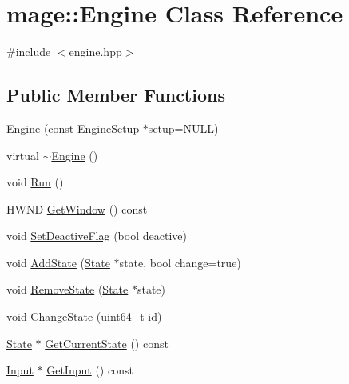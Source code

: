 \hypertarget{classmage_1_1_engine}{}\section{mage\+:\+:Engine Class Reference}
\label{classmage_1_1_engine}


{\ttfamily \#include $<$engine.\+hpp$>$}

\subsection*{Public Member Functions}
\begin{DoxyCompactItemize}
\item 
\hyperlink{classmage_1_1_engine_a5b49f3adf1dd889bb38f5325fd6db317}{Engine} (const \hyperlink{structmage_1_1_engine_setup}{Engine\+Setup} $\ast$setup=N\+U\+LL)
\item 
virtual \hyperlink{classmage_1_1_engine_a34628556f8397d70ed018d71e343c2f5}{$\sim$\+Engine} ()
\item 
void \hyperlink{classmage_1_1_engine_afdc05e214d3f47a6ea3a40dfffd86f80}{Run} ()
\item 
H\+W\+ND \hyperlink{classmage_1_1_engine_a1c5f9d8c68045b36f404251359aa41e4}{Get\+Window} () const
\item 
void \hyperlink{classmage_1_1_engine_a942bfa9892fa79bb1068d7c7ec4e6732}{Set\+Deactive\+Flag} (bool deactive)
\item 
void \hyperlink{classmage_1_1_engine_accbe7aea6388e097f7ce11a6c855f02a}{Add\+State} (\hyperlink{classmage_1_1_state}{State} $\ast$state, bool change=true)
\item 
void \hyperlink{classmage_1_1_engine_a72442e7262e498d0c82644f1ea413a95}{Remove\+State} (\hyperlink{classmage_1_1_state}{State} $\ast$state)
\item 
void \hyperlink{classmage_1_1_engine_a4f13698020e1e8ee155661c83a1d160d}{Change\+State} (uint64\+\_\+t id)
\item 
\hyperlink{classmage_1_1_state}{State} $\ast$ \hyperlink{classmage_1_1_engine_a4750928e48c3ae2e38d10bf8ec0e4816}{Get\+Current\+State} () const
\item 
\hyperlink{classmage_1_1_input}{Input} $\ast$ \hyperlink{classmage_1_1_engine_a55d099d040e8895803f15e214f3b6d9e}{Get\+Input} () const
\end{DoxyCompactItemize}

